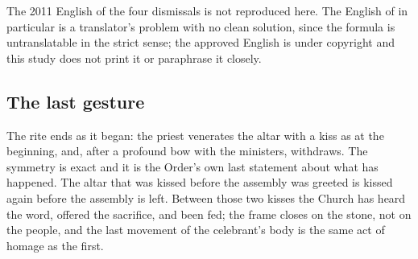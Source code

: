 The 2011 English of the four dismissals is not reproduced here. The English of  in particular is a translator's problem with no clean solution, since the formula is
untranslatable in the strict sense; the approved English is under copyright and this study does
not print it or paraphrase it closely.

\subsection{The last gesture}

The rite ends as it began: the priest venerates the altar with a kiss as at the beginning, and,
after a profound bow with the ministers, withdraws. The
symmetry is exact and it is the Order's own last statement about what has happened. The altar
that was kissed before the assembly was greeted is kissed again before the assembly is left.
Between those two kisses the Church has heard the word, offered the sacrifice, and been fed;
the frame closes on the stone, not on the people, and the last movement of the celebrant's body
is the same act of homage as the first.

